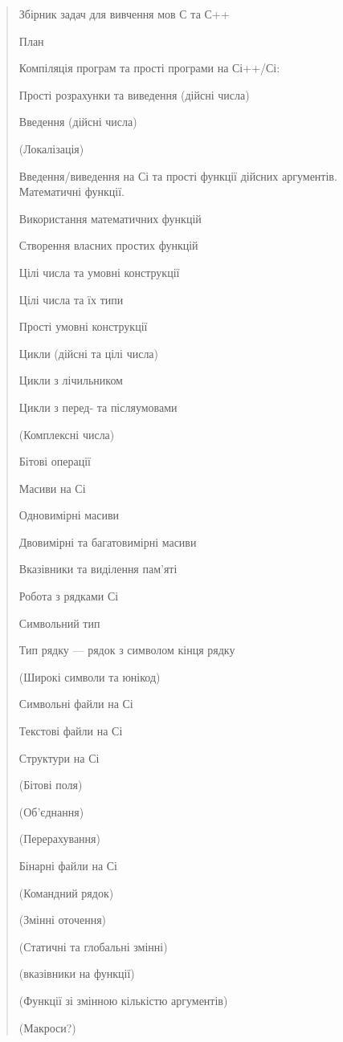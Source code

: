 \documentclass[]{article}
\date{}
\begin{document}
\begin{quote}
Збірник задач для вивчення мов С та С++

План

Компіляція програм та прості програми на Сі++/Сі:

Прості розрахунки та виведення (дійсні числа)

Введення (дійсні числа)

(Локалізація)

Введення/виведення на Сі та прості функції дійсних аргументів.
Математичні функції.

Використання математичних функцій

Створення власних простих функцій

Цілі числа та умовні конструкції

Цілі числа та їх типи

Прості умовні конструкції

Цикли (дійсні та цілі числа)

Цикли з лічильником

Цикли з перед- та післяумовами

(Комплексні числа)

Бітові операції

Масиви на Сі

Одновимірні масиви

Двовимірні та багатовимірні масиви

Вказівники та виділення пам'яті

Робота з рядками Сі

Символьний тип

Тип рядку --- рядок з символом кінця рядку

(Широкі символи та юнікод)

Символьні файли на Сі

Текстові файли на Сі

Структури на Сі

(Бітові поля)

(Об'єднання)

(Перерахування)

Бінарні файли на Сі

(Командний рядок)

(Змінні оточення)

(Статичні та глобальні змінні)

(вказівники на функції)

(Функції зі змінною кількістю аргументів)

(Макроси?)


\end{quote}
\end{document}
